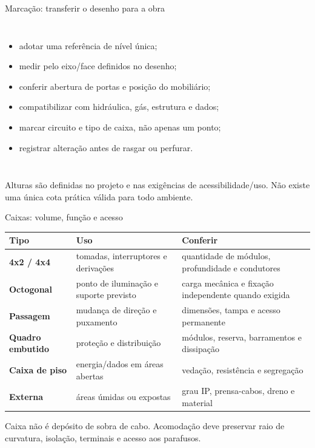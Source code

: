 \begin{frame}{Marcação: transferir o desenho para a obra}
\small
\begin{columns}[T,onlytextwidth]
\begin{itemize}
\item adotar uma referência de nível única;
\item medir pelo eixo/face definidos no desenho;
\item conferir abertura de portas e posição do mobiliário;
\item compatibilizar com hidráulica, gás, estrutura e dados;
\item marcar circuito e tipo de caixa, não apenas um ponto;
\item registrar alteração antes de rasgar ou perfurar.
\end{itemize}
\end{columns}
\begin{caixaObs}
Alturas são definidas no projeto e nas exigências de acessibilidade/uso. Não existe uma única cota prática válida para todo ambiente.
\end{caixaObs}
\end{frame}

\begin{frame}{Caixas: volume, função e acesso}
\small
\begin{tabularx}{\textwidth}{>{\bfseries}p{2.6cm}X X}
\toprule
Tipo & Uso & Conferir \\
\midrule
4x2 / 4x4 & tomadas, interruptores e derivações & quantidade de módulos, profundidade e condutores \\
Octogonal & ponto de iluminação e suporte previsto & carga mecânica e fixação independente quando exigida \\
Passagem & mudança de direção e puxamento & dimensões, tampa e acesso permanente \\
Quadro embutido & proteção e distribuição & módulos, reserva, barramentos e dissipação \\
Caixa de piso & energia/dados em áreas abertas & vedação, resistência e segregação \\
Externa & áreas úmidas ou expostas & grau IP, prensa-cabos, dreno e material \\
\bottomrule
\end{tabularx}
\begin{caixaAt}
Caixa não é depósito de sobra de cabo. Acomodação deve preservar raio de curvatura, isolação, terminais e acesso aos parafusos.
\end{caixaAt}
\end{frame}

